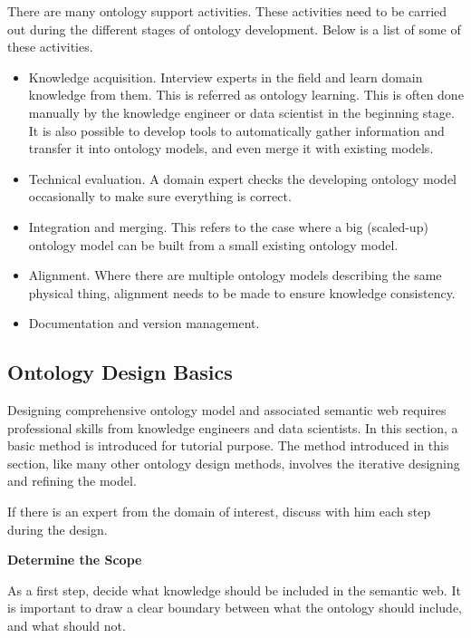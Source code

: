 There are many ontology support activities. These activities need to be carried out during the different stages of ontology development. Below is a list of some of these activities.
\begin{itemize}
	\item Knowledge acquisition. Interview experts in the field and learn domain knowledge from them. This is referred as ontology learning. This is often done manually by the knowledge engineer or data scientist in the beginning stage. It is also possible to develop tools to automatically gather information and transfer it into ontology models, and even merge it with existing models.
	\item Technical evaluation. A domain expert checks the developing ontology model occasionally to make sure everything is correct.
	\item Integration and merging. This refers to the case where a big (scaled-up) ontology model can be built from a small existing ontology model.
	\item Alignment. Where there are multiple ontology models describing the same physical thing, alignment needs to be made to ensure knowledge consistency.
	\item Documentation and version management.
\end{itemize}

\subsection{Ontology Design Basics} \label{subsec:ontology_design_basics}

Designing comprehensive ontology model and associated semantic web requires professional skills from knowledge engineers and data scientists. In this section, a basic method is introduced for tutorial purpose. The method introduced in this section, like many other ontology design methods, involves the iterative designing and refining the model.

If there is an expert from the domain of interest, discuss with him each step during the design.

\vspace{0.1in}
\noindent \textbf{Determine the Scope}
\vspace{0.1in}

As a first step, decide what knowledge should be included in the semantic web. It is important to draw a clear boundary between what the ontology should include, and what should not.

